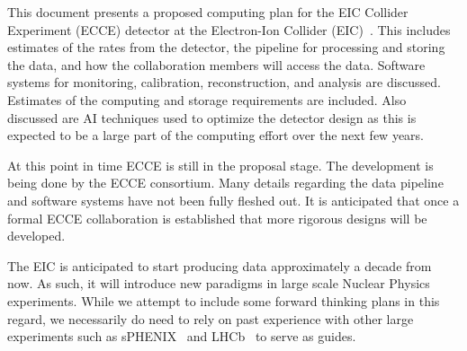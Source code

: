 

This document presents a proposed computing plan for the EIC Collider Experiment (ECCE) detector at the Electron-Ion Collider (EIC)~\cite{eic_yellow_report_v1_1}. This includes estimates of the rates from the detector, the pipeline for processing and storing the data, and how the collaboration members will access the data. Software systems for monitoring, calibration, reconstruction, and analysis are discussed. Estimates of the computing and storage requirements are included. Also discussed are AI techniques used to optimize the detector design as this is expected to be a large part of the computing effort over the next few years.

At this point in time ECCE is still in the proposal stage. The development is being done by the ECCE consortium. Many details regarding the data pipeline and software systems have not been fully fleshed out. It is anticipated that once a formal ECCE collaboration is established that more rigorous designs will be developed. 

The EIC is anticipated to start producing data approximately a decade from now. As such, it will introduce new paradigms in large scale Nuclear Physics experiments. While we attempt to include some forward thinking plans in this regard, we necessarily do need to rely on past experience with other large experiments such as sPHENIX~\cite{sphenix_computing_plan_2019} and LHCb~\cite{CAMPORAPEREZ2016280} to serve as guides.
